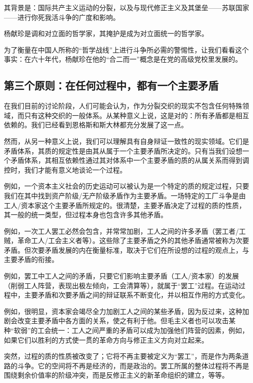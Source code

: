 \documentclass[fontset=fandol, a4paper, 12pt, twoside]{ctexart}
\begin{document}
其背景是：国际共产主义运动的分裂，以及与现代修正主义及其堡垒——苏联国家——进行你死我活斗争的广度和影响。

杨献珍是调和对立面的哲学家，其掩护是成为对立面统一的哲学家。

为了衡量在中国人所称的“哲学战线”上进行斗争所必需的警惕性，让我们看看这个事实：在六十年代，杨献珍在他的“合二而一”概念是在党的高级党校里发展的。

\subsection{第三个原则：在任何过程中，都有一个主要矛盾}

在我们目前的讨论阶段，人们可能会认为，作为分裂交织的现实不包含任何特殊领域，而只有这种交织的一般体系。从某种意义上说，这是对的：所有矛盾都是相互依赖的。我们已经看到恩格斯和斯大林都充分发展了这一点。

然而，从另一种意义上说，我们可以理解具有自身辩证一致性的现实领域。它们是矛盾体系，其质的规定性是由其从属于一个主要矛盾所决定的。只有当我们设想一个矛盾体系，其相互依赖性通过其对体系中一个主要矛盾的质的从属关系而得到调控时，我们才能有意义地谈论一个过程。

例如，一个资本主义社会的历史运动可以被认为是一个特定的质的规定过程，只要我们在其中找到资产阶级/无产阶级矛盾作为主要矛盾。一场特定的工厂斗争是由工人/资本家这个主要矛盾所规定的。很清楚，主要矛盾决定了过程的质的性质，其一般的统一类型，但过程本身也包含许多其他矛盾。

例如，一次工人罢工必然会包含，并常常加剧，工人之间的许多矛盾（罢工者/工贼，革命工人/工会主义者等）。这些除了主要矛盾之外的其他矛盾通常被称为次要矛盾。但次要矛盾发展的内在衡量标准，取决于它们在所设想的过程的观点上，与主要矛盾的衔接。

例如，罢工中工人之间的矛盾，只要它们影响主要矛盾（工人/资本家）的发展（削弱工人阵营，表现出极左倾向，工会清算等），就属于“罢工”过程。在运动过程中，主要矛盾和次要矛盾之间的辩证联系不断变化，并以相互作用的方式变化。

例如，很明显，资本家会竭尽全力加剧工人之间的某些矛盾，因为反过来，这种加剧会改变主要矛盾中各方面的关系，使之有利于他。但毛主义者也可以攻击某种“软弱”的工会统一：工人之间严重的矛盾可以成为加强他们阵营的因素，例如，如果它们以胜利的方式使一贯的革命方向与修正主义方向对立起来。

突然，过程的质的性质被改变了；它将不再主要被定义为“罢工”，而是作为两条道路的斗争。它的空间将不再是经济的，而是政治的。罢工所属的整体过程将不再是围绕剩余价值率的阶级冲突，而是反修正主义的新革命组织的建立，等等。
\end{document}
